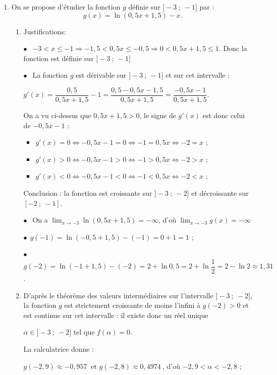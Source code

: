 \documentclass[10pt]{article}
\providecommand{\np}[2][]{{#2~#1}}
\begin{document}
\begin{enumerate}
\begin{enumerate}
$\displaystyle\lim_{n \to + \infty}u_n = -3$.
La suite $\left(u_n\right)$ converge vers $- 3$.
	\end{enumerate}
\item On se propose d'étudier la fonction $g$ définie sur $]-3~;~-1]$ par :
\[g(x) = \ln (0,5 x + 1,5) - x.\]
	\begin{enumerate}
		\item Justifications:
		
$\bullet~~$ $- 3 < x \leqslant - 1 \Rightarrow - 1,5 < 0,5x \leqslant - 0,5 \Rightarrow 0 < 0,5x + 1,5 \leqslant 1 $. Donc la fonction est définie sur $]- 3~;~- 1]$

$\bullet~~$ La fonction $g$ est dérivable sur $]- 3~;~- 1]$ et sur cet intervalle :

$g'(x) = \dfrac{0,5}{0,5x + 1,5} - 1 = \dfrac{0,5 - 0,5x - 1,5}{0,5x + 1,5} = \dfrac{-0,5x - 1}{0,5x + 1,5}$.

On a vu ci-dessus que $0,5x + 1,5 > 0$, le signe de $g'(x)$ est donc celui de $-0,5x - 1$ :

\begin{itemize}
\item $g'(x) = 0 \iff -0,5x - 1 = 0 \iff - 1 = 0,5x \iff - 2 = x$ ;
\item $g'(x) > 0 \iff -0,5x - 1 > 0 \iff - 1 > 0,5x \iff - 2 > x$ ;
\item $g'(x) < 0 \iff -0,5x - 1 < 0 \iff - 1 <0,5x \iff - 2 < x$ ;
\end{itemize}

Conclusion : la fonction est croissante sur $]-3~;~-2]$ et décroissante sur $[- 2~;~-1]$.

$\bullet~~$ On a $\displaystyle\lim_{x \to - 3} \ln (0,5 x + 1,5) = - \infty$, d'où $\displaystyle\lim_{x \to - 3}g(x) = - \infty$

$\bullet~~$$g(- 1) = \ln (-0,5 + 1,5) - (- 1) = 0 + 1 = 1$ ;

$\bullet~~$$g(-2) = \ln (- 1+ 1,5) - (- 2) = 2 + \ln 0,5 = 2 + \ln \dfrac12 = 2 - \ln 2 \approx 1,31$.
		\item D'après le théorème des valeurs intermédiaires sur l'intervalle $]- 3~;~- 2]$, la fonction $g$ est strictement croissante de moins l'infini à $g(-2) > 0$ et est continue sur cet intervalle : il existe donc un réel unique 

$\alpha \in ]- 3~;~-2]$ tel que $f(\alpha) = 0$.

La calculatrice donne :

$g(-2,9) \approx \np{- 0,957}$ et $g(-2,8) \approx \np{0,4974}$, d'où $-2,9 < \alpha < -2,8$ ;


\end{enumerate}
\end{enumerate}
\end{document}
